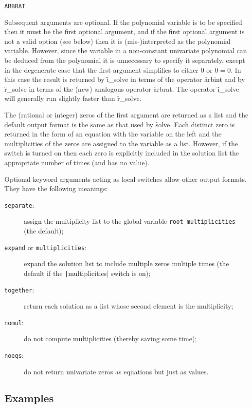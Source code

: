 \hypertarget{operator:ARBRAT}{\texttt{ARBRAT}}
Subsequent arguments are optional.  If the polynomial variable is to
be specified then it must be the first optional argument, and if the
first optional argument is not a valid option (see below) then it is
(mis-)interpreted as the polynomial variable.  However, since the
variable in a non-constant univariate polynomial can be deduced from
the polynomial it is unnecessary to specify it separately, except in
the degenerate case that the first argument simplifies to either 0 or
$0 = 0$.  In this case the result is returned by \f{i\_solve} in
terms of the operator \f{arbint} and by \f{r\_solve} in terms of
the (new) analogous operator \f{arbrat}.  The operator
\f{i\_solve} will generally run slightly faster than \f{r\_solve}.
  
The (rational or integer) zeros of the first argument are returned as
a list and the default output format is the same as that used by
\f{solve}.  Each distinct zero is returned in the form of an
equation with the variable on the left and the multiplicities of the
zeros are assigned to the variable  as a
list.  However, if the switch  is turned on then
each zero is explicitly included in the solution list the appropriate
number of times (and  has no value).
  
\begin{sloppypar}
Optional keyword arguments acting as local switches allow other output
formats.  They have the following meanings:
\begin{description}
\item[\texttt{separate}:] assign the multiplicity list to the global
  variable \texttt{root\_multiplicities} (the default);
\item[\texttt{expand} \textnormal{or} \texttt{multiplicities}:] expand the solution
  list to include multiple zeros multiple times (the default if the
  \texttt|multiplicities| switch is on);
\item[\texttt{together}:] return each solution as a list whose second
  element is the multiplicity;
\item[\texttt{nomul}:] do not compute multiplicities (thereby saving
  some time);
\item[\texttt{noeqs}:] do not return univariate zeros as equations but
  just as values.
\end{description}
\end{sloppypar}


\subsection{Examples}

